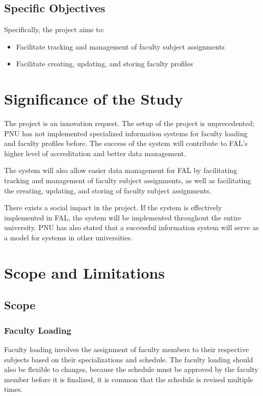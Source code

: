 \subsection{Specific Objectives}
Specifically, the project aims to:
\begin{itemize}
\item Facilitate tracking and management of faculty subject assignments
\item Facilitate creating, updating, and storing faculty profiles
\end{itemize}

\section{Significance of the Study}
The project is an innovation request. The setup of the project is unprecedented; PNU has not implemented specialized information systems for faculty loading and faculty profiles before. The success of the system will contribute to FAL’s higher level of accreditation and better data management.

The system will also allow easier data management for FAL by facilitating tracking and management of faculty subject assignments, as well as facilitating the creating, updating, and storing of faculty subject assignments. 

There exists a social impact in the project. If the system is effectively implemented in FAL, the system will be implemented throughout the entire university. PNU has also stated that a successful information system will serve as a model for systems in other universities.

\section{Scope and Limitations}

\subsection{Scope}

\subsubsection{Faculty Loading}
Faculty loading involves the assignment of faculty members to their respective subjects based on their specializations and schedule. The faculty loading should also be flexible to changes, because the schedule must be approved by the faculty member before it is finalized, it is common that the schedule is revised multiple times. 

